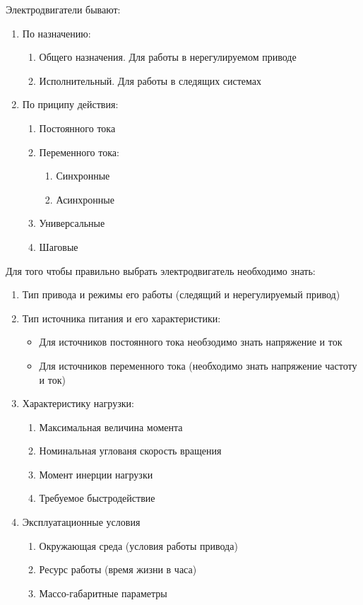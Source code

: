 \documentclass{article}
\begin{document}
Электродвигатели бывают:
\begin{enumerate}
	\item По назначению:
	\begin{enumerate}
		\item Общего назначения. Для работы в нерегулируемом приводе
		\item Исполнительный. Для работы в следящих системах
	\end{enumerate}
	\item По приципу действия:
	\begin{enumerate}
		\item Постоянного тока
		\item Переменного тока:
		\begin{enumerate}
			\item Синхронные
			\item Асинхронные
		\end{enumerate}
		\item Универсальные
		\item Шаговые
	\end{enumerate}
\end{enumerate}

Для того чтобы правильно выбрать электродвигатель необходимо знать:
\begin{enumerate}
	\item Тип привода и режимы его работы (следящий и нерегулируемый привод)
	\item Тип источника питания и его характеристики:
	\begin{itemize}
		\item Для источников постоянного тока необзодимо знать напряжение и ток
		\item Для источников переменного тока (необходимо знать напряжение частоту и ток)
	\end{itemize}
	\item Характеристику нагрузки:
	\begin{enumerate}
		\item Максимальная величина момента
		\item Номинальная углованя скорость вращения
		\item Момент инерции нагрузки
		\item Требуемое быстродействие
	\end{enumerate}
	\item Эксплуатационные условия
	\begin{enumerate}
		\item Окружающая среда (условия работы привода)
		\item Ресурс работы (время жизни в часа)
		\item Массо-габаритные параметры
	\end{enumerate}
\end{enumerate}
\end{document}

